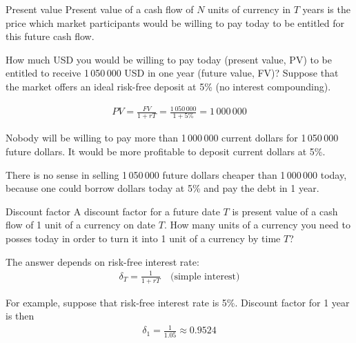 \documentclass{beamer}
\begin{document}
\begin{frame}{Present value}
\justify
\alert{Present value} of a cash flow of $N$ units of currency in $T$ years is the price which market participants would be willing to pay today to be entitled for this future cash flow.

\justify
How much USD you would be willing to pay today (present value, PV) to be entitled to receive 1\,050\,000 USD in one year (future value, FV)? Suppose that the market offers an ideal risk-free deposit at 5\% (no interest compounding).

\begin{align*}
PV = \frac{FV}{1+rT} = \frac{1\,050\,000}{1 + 5\%} = 1\,000\,000
\end{align*}

\justify
Nobody will be willing to pay more than 1\,000\,000 current dollars for 1\,050\,000 future dollars. It would be more profitable to deposit current dollars at 5\%.

\justify
There is no sense in selling 1\,050\,000 future dollars cheaper than 1\,000\,000 today, because one could borrow dollars today at 5\% and pay the debt in 1 year.
\end{frame}



\begin{frame}{Discount factor}
\justify
A \alert{discount factor} for a future date $T$ is present value of a cash flow of 1 unit of a currency on date $T$. How many units of a currency you need to posses today in order to turn it into 1 unit of a currency by time $T$?

\justify
The answer depends on risk-free interest rate:
\begin{align*}
\delta_T = \frac{1}{1 + rT} \quad \text{(simple interest)}
\end{align*}

\justify
For example, suppose that risk-free interest rate is 5\%.  Discount factor for 1 year is then
\begin{align*}
\delta_1 = \frac{1}{1.05} \approx 0.9524
\end{align*}
\end{frame}
\end{document}
